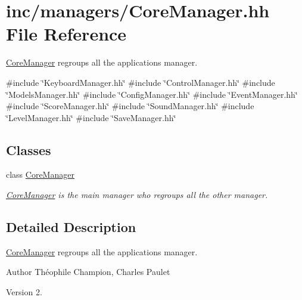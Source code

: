 \hypertarget{CoreManager_8hh}{}\section{inc/managers/\+Core\+Manager.hh File Reference}
\label{CoreManager_8hh}


\hyperlink{classCoreManager}{Core\+Manager} regroups all the application\textquotesingle{}s manager.  


{\ttfamily \#include \char`\"{}Keyboard\+Manager.\+hh\char`\"{}}\newline
{\ttfamily \#include \char`\"{}Control\+Manager.\+hh\char`\"{}}\newline
{\ttfamily \#include \char`\"{}Models\+Manager.\+hh\char`\"{}}\newline
{\ttfamily \#include \char`\"{}Config\+Manager.\+hh\char`\"{}}\newline
{\ttfamily \#include \char`\"{}Event\+Manager.\+hh\char`\"{}}\newline
{\ttfamily \#include \char`\"{}Score\+Manager.\+hh\char`\"{}}\newline
{\ttfamily \#include \char`\"{}Sound\+Manager.\+hh\char`\"{}}\newline
{\ttfamily \#include \char`\"{}Level\+Manager.\+hh\char`\"{}}\newline
{\ttfamily \#include \char`\"{}Save\+Manager.\+hh\char`\"{}}\newline
\subsection*{Classes}
\begin{DoxyCompactItemize}
\item 
class \hyperlink{classCoreManager}{Core\+Manager}
\begin{DoxyCompactList}\small\item\em \hyperlink{classCoreManager}{Core\+Manager} is the main manager who regroups all the other manager. \end{DoxyCompactList}\end{DoxyCompactItemize}


\subsection{Detailed Description}
\hyperlink{classCoreManager}{Core\+Manager} regroups all the application\textquotesingle{}s manager. 

\begin{DoxyAuthor}{Author}
Théophile Champion, Charles Paulet 
\end{DoxyAuthor}
\begin{DoxyVersion}{Version}
2. 
\end{DoxyVersion}
